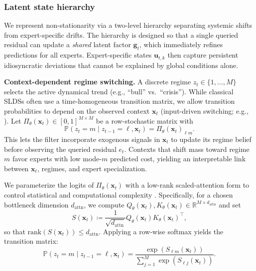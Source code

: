 \subsubsection{Latent state hierarchy}
We represent non-stationarity via a two-level hierarchy separating systemic shifts from
expert-specific drifts.
The hierarchy is designed so that a single queried residual can update a \emph{shared} latent factor
\(\mathbf{g}_t\), which immediately refines predictions for all experts. Expert-specific states
\(\mathbf{u}_{t,k}\) then capture persistent idiosyncratic deviations that cannot be explained by global
conditions alone.

\textbf{Context-dependent regime switching.}
A discrete regime \(z_t\in\{1,\dots,M\}\) selects the active dynamical trend (e.g., ``bull'' vs.\ ``crisis'').
While classical SLDSs often use a time-homogeneous transition matrix, we allow transition
probabilities to depend on the observed context \(\mathbf{x}_t\) (input-driven switching; e.g.,
\citet{bengio1994input}). Let
\(\Pi_\theta(\mathbf{x}_t)\in[0,1]^{M\times M}\) be a row-stochastic matrix with
\begin{equation*}
    \mathbb{P}(z_t=m \mid z_{t-1}=\ell,\mathbf{x}_t)=\Pi_\theta(\mathbf{x}_t)_{\ell m}.
\end{equation*}
This lets the filter incorporate exogenous signals in \(\mathbf{x}_t\) to update its regime belief
before observing the queried residual \(e_t\). Contexts that shift mass toward regime \(m\) favor
experts with low mode-\(m\) predicted cost, yielding
an interpretable link between \(\mathbf{x}_t\), regimes, and expert specialization.

We parameterize the logits of \(\Pi_\theta(\mathbf{x}_t)\) with a low-rank scaled-attention form to
control statistical and computational complexity \citep{allyouneed, kossen2021self, mehta2022neural}.
Specifically, for a chosen bottleneck dimension \(d_{\mathrm{attn}}\), we compute
\(Q_\theta(\mathbf{x}_t),K_\theta(\mathbf{x}_t)\in\mathbb{R}^{M\times d_{\mathrm{attn}}}\) and set
\[
S(\mathbf{x}_t)\coloneqq \frac{1}{\sqrt{d_{\mathrm{attn}}}}Q_\theta(\mathbf{x}_t)K_\theta(\mathbf{x}_t)^\top,
\]
so that \(\mathrm{rank}(S(\mathbf{x}_t))\le d_{\mathrm{attn}}\). Applying a row-wise softmax yields the
transition matrix:
\begin{equation}
\label{eq:context_transitions}
\mathbb{P}(z_t=m \mid z_{t-1}=\ell,\mathbf{x}_t)
=
\frac{\exp(S_{\ell m}(\mathbf{x}_t))}{\sum_{j=1}^M \exp(S_{\ell j}(\mathbf{x}_t))}.
\end{equation}

